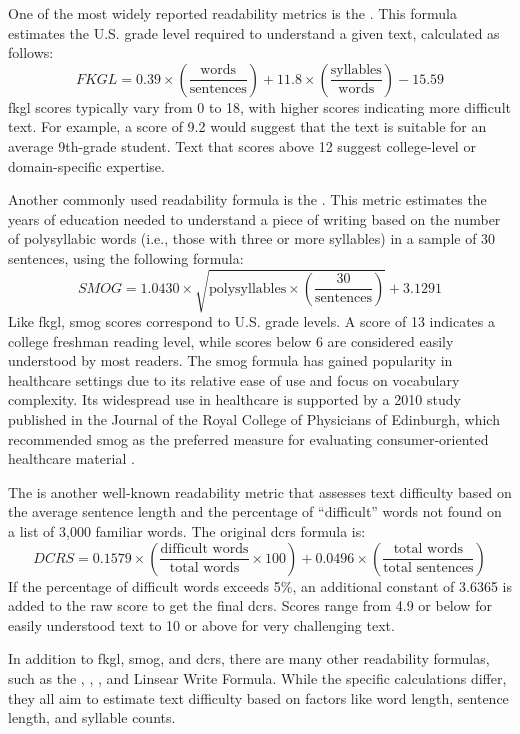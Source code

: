 One of the most widely reported readability metrics is the . This formula estimates the U.S. grade level required to understand a given text, calculated as follows:
$$FKGL = 0.39 \times \left(\frac{\text{words}}{\text{sentences}}\right) + 11.8 \times \left(\frac{\text{syllables}}{\text{words}}\right) - 15.59$$
\gls{fkgl} scores typically vary from 0 to 18, with higher scores indicating more difficult text. For example, a score of 9.2 would suggest that the text is suitable for an average 9th-grade student. Text that scores above 12 suggest college-level or domain-specific expertise.

Another commonly used readability formula is the . This metric estimates the years of education needed to understand a piece of writing based on the number of polysyllabic words (i.e., those with three or more syllables) in a sample of 30 sentences, using the following formula:
$$SMOG = 1.0430 \times \sqrt{\text{polysyllables} \times \left(\frac{30}{\text{sentences}}\right)} + 3.1291$$
Like \gls{fkgl}, \gls{smog} scores correspond to U.S. grade levels. A score of 13 indicates a college freshman reading level, while scores below 6 are considered easily understood by most readers. The \gls{smog} formula has gained popularity in healthcare settings due to its relative ease of use and focus on vocabulary complexity. Its widespread use in healthcare is supported by a 2010 study published in the Journal of the Royal College of Physicians of Edinburgh, which recommended \gls{smog} as the preferred measure for evaluating consumer-oriented healthcare material \cite{Fitzsimmons2010-mq}.

The  is another well-known readability metric that assesses text difficulty based on the average sentence length and the percentage of ``difficult'' words not found on a list of 3,000 familiar words. The original \gls{dcrs} formula is:
$$DCRS = 0.1579 \times \left(\frac{\text{difficult words}}{\text{total words}} \times 100\right) + 0.0496 \times \left(\frac{\text{total words}}{\text{total sentences}}\right)$$
If the percentage of difficult words exceeds 5\%, an additional constant of 3.6365 is added to the raw score to get the final \gls{dcrs}. Scores range from 4.9 or below for easily understood text to 10 or above for very challenging text.

In addition to \gls{fkgl}, \gls{smog}, and \gls{dcrs}, there are many other readability formulas, such as the , , , and Linsear Write Formula. While the specific calculations differ, they all aim to estimate text difficulty based on factors like word length, sentence length, and syllable counts.

